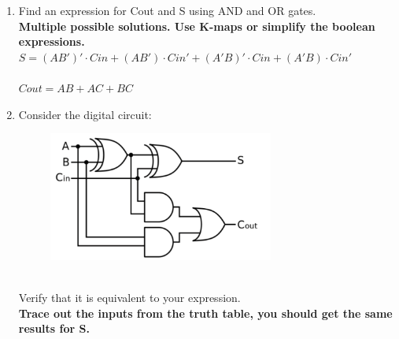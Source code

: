 \documentclass{article}
\begin{document}
\begin{enumerate}[label=\alph*.]
    \item Find an expression for Cout and S using AND and OR gates.\\
    \textbf{Multiple possible solutions. Use K-maps or simplify the boolean expressions.}\\
    $S = (AB')' \cdot Cin + (AB') \cdot Cin' + (A'B)' \cdot Cin + (A'B) \cdot Cin'$ \\
    \\
    $Cout = AB + AC + BC$
    
    \item Consider the digital circuit: 
    \begin{figure}[!h]
        \centering
        \includegraphics[width=0.7\textwidth]{figures/adder1b.png}
    \end{figure}
    \\ Verify that it is equivalent to your expression. \\
    \textbf{Trace out the inputs from the truth table, you should get the same results for S.}
\end{enumerate}
\end{document}
